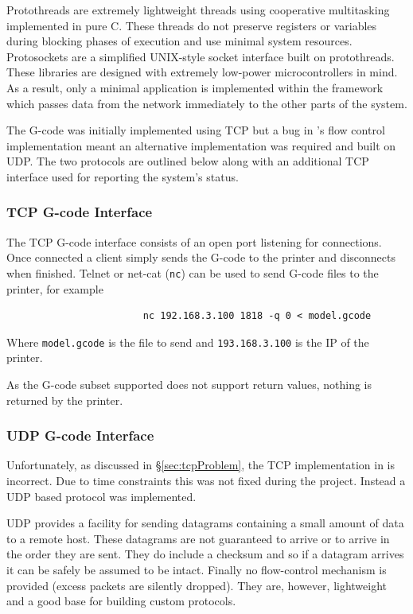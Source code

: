 			Protothreads are extremely lightweight threads using cooperative
			multitasking implemented in pure C. These threads do not preserve
			registers or variables during blocking phases of execution and use minimal
			system resources. Protosockets are a simplified UNIX-style socket
			interface built on protothreads. These libraries are designed with
			extremely low-power microcontrollers in mind.  As a result, only a minimal
			application is implemented within the \uIP{} framework which passes data
			from the network immediately to the other parts of the system.
			
			The G-code was initially implemented using TCP but a bug in \uIP{}'s flow
			control implementation meant an alternative implementation was required
			and built on UDP. The two protocols are outlined below along with an
			additional TCP interface used for reporting the system's status.
			
				\subsubsection{TCP G-code Interface}
					
					The TCP G-code interface consists of an open port listening for
					connections. Once connected a client simply sends the G-code to the
					printer and disconnects when finished. Telnet or net-cat (\verb|nc|)
					can be used to send G-code files to the printer, for example
					\begin{verbatim}
						nc 192.168.3.100 1818 -q 0 < model.gcode
					\end{verbatim}
					Where \verb|model.gcode| is the file to send and \verb|193.168.3.100|
					is the IP of the printer.
					
					As the G-code subset supported does not support return values, nothing
					is returned by the printer.
				
				\subsubsection{UDP G-code Interface}
					
					\label{sec:udpimpl}
					
					Unfortunately, as discussed in \S\ref{sec:tcpProblem}, the TCP
					implementation in \uIP{} is incorrect. Due to time constraints this
					was not fixed during the project. Instead a UDP based protocol was
					implemented.
					
					UDP provides a facility for sending datagrams containing a small
					amount of data to a remote host. These datagrams are not guaranteed to
					arrive or to arrive in the order they are sent. They do include a
					checksum and so if a datagram arrives it can be safely be assumed to
					be intact. Finally no flow-control mechanism is provided (excess
					packets are silently dropped). They are, however, lightweight and a
					good base for building custom protocols.
					
